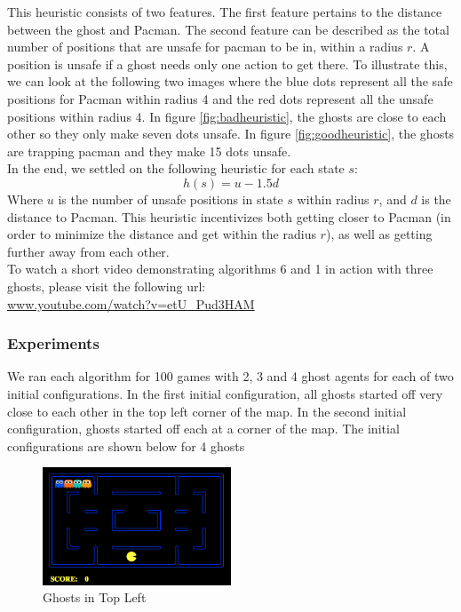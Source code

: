 \documentclass[11pt]{article}
\begin{document}
This heuristic consists of two features. The first feature pertains to the distance between the ghost and Pacman. The second feature can be described as the total number of positions that are unsafe for pacman to be in, within a radius $r$. A position is unsafe if a ghost needs only one action to get there. To illustrate this, we can look at the following two images where the blue dots represent all the safe positions for Pacman within radius 4 and the red dots represent all the unsafe positions within radius 4. In figure \ref{fig:badheuristic}, the ghosts are close to each other so they only make seven dots unsafe. In figure \ref{fig:goodheuristic}, the ghosts are trapping pacman and they make 15 dots unsafe.\\ 

In the end, we settled on the following heuristic for each state $s$:
$$h(s) = u - 1.5d$$ Where $u$ is the number of unsafe positions in state $s$ within radius $r$, and $d$ is the distance to Pacman. This heuristic incentivizes both getting closer to Pacman (in order to minimize the distance and get within the radius $r$), as well as getting further away from each other.\\
To watch a short video demonstrating algorithms 6 and 1 in action with three ghosts, please visit the following url: \\
\url{www.youtube.com/watch?v=etU_Pud3HAM}



\subsubsection{Experiments}
We ran each algorithm for 100 games with 2, 3 and 4 ghost agents for each of two initial configurations. In the first initial configuration, all ghosts started off very close to each other in the top left corner of the map. In the second initial configuration, ghosts started off each at a corner of the map. The initial configurations are shown below for 4 ghosts

\begin{figure}[H]
	\includegraphics[width=0.5\textwidth]{maptogether.png}
	\caption{Ghosts in Top Left}
	\label{fig:maptogether}
\end{figure}
\end{document}

